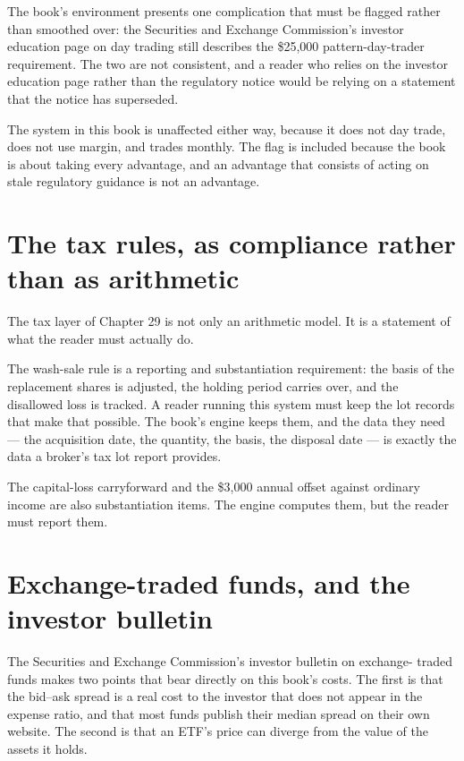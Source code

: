 The book's environment presents one complication that must be flagged
rather than smoothed over: the Securities and Exchange Commission's
investor education page on day trading still describes the \$25,000
pattern-day-trader requirement. The two are not consistent, and a reader
who relies on the investor education page rather than the regulatory notice
would be relying on a statement that the notice has superseded.

The system in this book is unaffected either way, because it does not day
trade, does not use margin, and trades monthly. The flag is included
because the book is about taking every advantage, and an advantage that
consists of acting on stale regulatory guidance is not an advantage.

\section{The tax rules, as compliance rather than as arithmetic}

The tax layer of Chapter 29 is not only an arithmetic model. It is a
statement of what the reader must actually do.

The wash-sale rule is a reporting and substantiation requirement: the
basis of the replacement shares is adjusted, the holding period carries
over, and the disallowed loss is tracked. A reader running this system
must keep the lot records that make that possible. The book's engine
keeps them, and the data they need --- the acquisition date, the
quantity, the basis, the disposal date --- is exactly the data a broker's
tax lot report provides.

The capital-loss carryforward and the \$3,000 annual offset against
ordinary income are also substantiation items. The engine computes them,
but the reader must report them.

\section{Exchange-traded funds, and the investor bulletin}

The Securities and Exchange Commission's investor bulletin on exchange-
traded funds makes two points that bear directly on this book's costs.
The first is that the bid--ask spread is a real cost to the investor that
does not appear in the expense ratio, and that most funds publish their
median spread on their own website. The second is that an ETF's price can
diverge from the value of the assets it holds.

